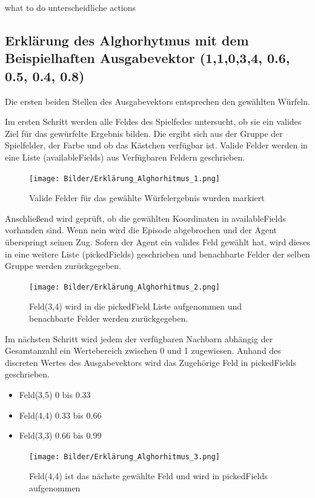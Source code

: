 what to do unterscheidliche actions


\newpage
\subsection{Erklärung des Alghorhytmus mit dem Beispielhaften Ausgabevektor (1,1,0,3,4, 0.6, 0.5, 0.4, 0.8)}
Die ersten beiden Stellen des Ausgabevektors entsprechen den gewählten Würfeln.

Im ersten Schritt werden alle Feldes des Spielfedes untersucht, ob sie ein valides Ziel für das gewürfelte Ergebnis bilden.
Die ergibt sich aus der Gruppe der Spielfelder, der Farbe und ob das Kästchen verfügbar ist.
Valide Felder werden in eine Liste (availableFields) aus Verfügbaren Feldern geschrieben.

\begin{figure}[!h]
	\centering
	\texttt{[image: Bilder/Erklärung\_Alghorhitmus\_1.png]}
	\caption{Valide Felder für das gewählte Würfelergebnis wurden markiert}
\end{figure}

Anschließend wird geprüft, ob die gewählten Koordinaten in availableFields vorhanden sind.
Wenn nein wird die Episode abgebrochen und der Agent überspringt seinen Zug.
Sofern der Agent ein valides Feld gewählt hat, wird dieses in eine weitere Liste (pickedFields) geschrieben und benachbarte Felder der selben Gruppe werden zurückgegeben.

\newpage
\begin{figure}[!h]
	\centering
	\texttt{[image: Bilder/Erklärung\_Alghorhitmus\_2.png]}
	\caption{Feld(3,4) wird in die pickedField Liste aufgenommen und benachbarte Felder werden zurückgegeben.}
\end{figure}

Im nächsten Schritt wird jedem der verfügbaren Nachbarn abhängig der Gesamtanzahl ein Wertebereich zwischen 0 und 1 zugewiesen. Anhand des discreten Wertes des Ausgabevektors wird das Zugehörige Feld in pickedFields geschrieben.
\begin{itemize}
\item Feld(3,5) 0 bis 0.33
\item Feld(4,4) 0.33 bis 0.66
\item Feld(3,3) 0.66 bis 0.99
\end{itemize}

\begin{figure}[!h]
	\centering
	\texttt{[image: Bilder/Erklärung\_Alghorhitmus\_3.png]}
	\caption{Feld(4,4) ist das nächste gewählte Feld und wird in pickedFields aufgenommen}
\end{figure}

